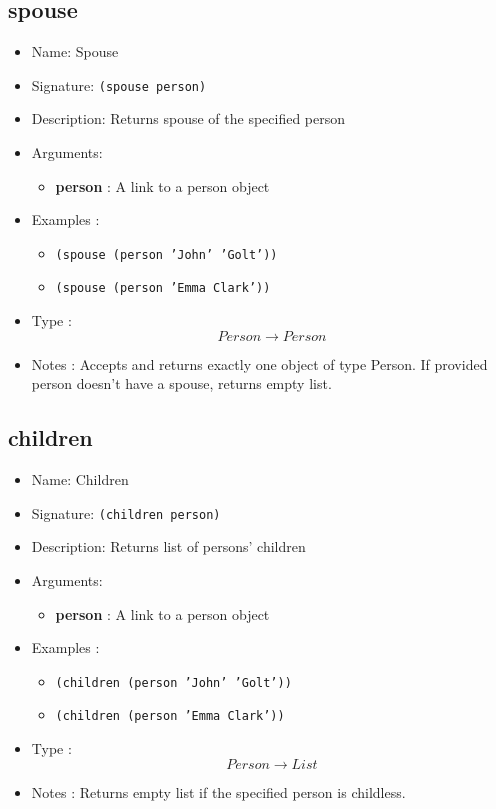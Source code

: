 \subsection{spouse}
\begin{itemize}
    \item Name: Spouse
    \item Signature: \texttt{(spouse person)}
    \item Description: Returns spouse of the specified person
    \item Arguments:
        \begin{itemize}
            \item \textbf{person} : A link to a person object
        \end{itemize}
    \item Examples :
        \begin{itemize}
            \item \texttt{(spouse (person 'John' 'Golt'))}
            \item \texttt{(spouse (person 'Emma Clark'))}
        \end{itemize}
    \item Type : \[Person \to Person\]
    \item Notes : Accepts and returns exactly one object of type Person. If provided person doesn't have a spouse, returns empty
        list.
\end{itemize}

\subsection{children}
\begin{itemize}
    \item Name: Children
    \item Signature: \texttt{(children person)}
    \item Description: Returns list of persons' children
    \item Arguments:
        \begin{itemize}
            \item \textbf{person} : A link to a person object
        \end{itemize}
    \item Examples :
        \begin{itemize}
            \item \texttt{(children (person 'John' 'Golt'))}
            \item \texttt{(children (person 'Emma Clark'))}
        \end{itemize}
    \item Type : \[Person \to List\]
    \item Notes : Returns empty list if the specified person is childless.
\end{itemize}

